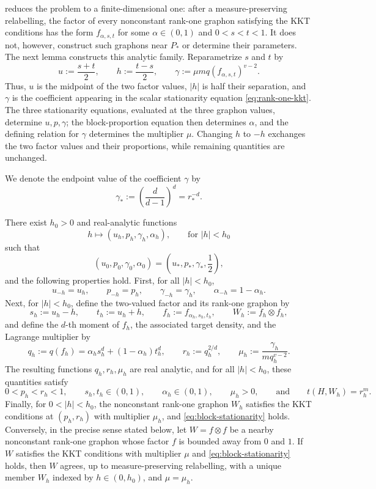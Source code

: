  reduces the problem to a finite-dimensional
one: after a measure-preserving relabelling, the factor of every nonconstant
rank-one graphon satisfying the KKT conditions has the form
$f_{\alpha,s,t}$ for some $\alpha\in(0,1)$ and $0<s<t<1$.  It does not,
however, construct such graphons near $P_*$ or determine their parameters.
The next lemma constructs this analytic family.
Reparametrize $s$ and $t$ by
\[
  u:=\frac{s+t}{2},
  \qquad
  h:=\frac{t-s}{2},
  \qquad
  \gamma:=\mu m q(f_{\alpha,s,t})^{v-2}.
\]
Thus, $u$ is the midpoint of the two factor values, $|h|$ is half their
separation, and $\gamma$ is the coefficient appearing in the scalar
stationarity equation \eqref{eq:rank-one-kkt}.
The three stationarity equations, evaluated at the three graphon values,
determine $u,p,\gamma$; the block-proportion equation then determines
$\alpha$, and the defining relation for $\gamma$ determines the multiplier $\mu$.
Changing $h$ to $-h$ exchanges the two factor values and their proportions,
while remaining quantities are unchanged.

We denote the endpoint value of the coefficient $\gamma$ by
\[
  \gamma_*:=\left(\frac{d}{d-1}\right)^d=r_*^{-d}.
\]

\begin{lemma}
\label{lem:rank-one-kkt-family}
There exist $h_0>0$ and real-analytic functions
\[
  h\longmapsto(u_h,p_h,\gamma_h,\alpha_h),
  \qquad \text{for } |h|<h_0
\]
such that
\[
  (u_0,p_0,\gamma_0,\alpha_0)
  =\left(u_*,p_*,\gamma_*,\frac12\right),
\]
and the following properties hold.  First, for all $|h|<h_0$,
\[
  u_{-h}=u_h,\qquad p_{-h}=p_h,\qquad
  \gamma_{-h}=\gamma_h,\qquad \alpha_{-h}=1-\alpha_h.
\]
Next, for $|h|<h_0$, define the two-valued factor and its rank-one graphon by
\[
  s_h:=u_h-h,
  \qquad 
  t_h:=u_h+h,
  \qquad
  f_h:=f_{\alpha_h,s_h,t_h}, 
  \qquad
  W_h:=f_h\otimes f_h,
\]
and define the $d$-th moment of $f_h$, the associated target density, and the
Lagrange multiplier by
\[
  q_h:=q(f_h)=\alpha_hs_h^d+(1-\alpha_h)t_h^d,
  \qquad
  r_h:=q_h^{2/d}, 
  \qquad
  \mu_h:=\frac{\gamma_h}{m q_h^{v-2}}.
\]
The resulting functions $q_h,r_h,\mu_h$ are real analytic, and for all
$|h|<h_0$, these quantities satisfy
\[
  0<p_h<r_h<1,
  \qquad s_h,t_h\in(0,1),
  \qquad \alpha_h\in(0,1),
  \qquad \mu_h>0,
  \qquad\text{and}\qquad
  t(H,W_h)=r_h^m.
\]
Finally, for $0<|h|<h_0$, the nonconstant rank-one graphon $W_h$ satisfies
the KKT conditions at $(p_h,r_h)$ with multiplier $\mu_h$, and
\eqref{eq:block-stationarity} holds.  Conversely, in the precise
sense stated below, let $W=f\otimes f$ be a nearby nonconstant rank-one
graphon whose factor $f$ is bounded away from $0$ and $1$.  If $W$ satisfies
the KKT conditions with multiplier $\mu$ and
\eqref{eq:block-stationarity} holds, then $W$ agrees, up to
measure-preserving relabelling, with a unique member $W_h$ indexed by
$h\in(0,h_0)$, and $\mu=\mu_h$.
\end{lemma}

